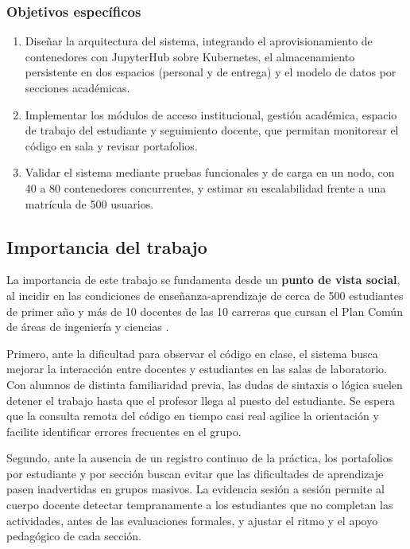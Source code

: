 \subsubsection*{Objetivos específicos}
\begin{enumerate}
    \item Diseñar la arquitectura del sistema, integrando el aprovisionamiento de contenedores con JupyterHub sobre Kubernetes, el almacenamiento persistente en dos espacios (personal y de entrega) y el modelo de datos por secciones académicas.
    \item Implementar los módulos de acceso institucional, gestión académica, espacio de trabajo del estudiante y seguimiento docente, que permitan monitorear el código en sala y revisar portafolios.
    \item Validar el sistema mediante pruebas funcionales y de carga en un nodo, con 40 a 80 contenedores concurrentes, y estimar su escalabilidad frente a una matrícula de 500 usuarios.
\end{enumerate}

\subsection{Importancia del trabajo}
\label{subsec:importancia}

La importancia de este trabajo se fundamenta desde un \textbf{punto de vista social}, al incidir en las condiciones de enseñanza-aprendizaje de cerca de 500 estudiantes de primer año y más de 10 docentes de las 10 carreras que cursan el Plan Común de áreas de ingeniería y ciencias \cite{uv2026carreras}.

Primero, ante la dificultad para observar el código en clase, el sistema busca mejorar la interacción entre docentes y estudiantes en las salas de laboratorio. Con alumnos de distinta familiaridad previa, las dudas de sintaxis o lógica suelen detener el trabajo hasta que el profesor llega al puesto del estudiante. Se espera que la consulta remota del código en tiempo casi real agilice la orientación y facilite identificar errores frecuentes en el grupo.

Segundo, ante la ausencia de un registro continuo de la práctica, los portafolios por estudiante y por sección buscan evitar que las dificultades de aprendizaje pasen inadvertidas en grupos masivos. La evidencia sesión a sesión permite al cuerpo docente detectar tempranamente a los estudiantes que no completan las actividades, antes de las evaluaciones formales, y ajustar el ritmo y el apoyo pedagógico de cada sección.


